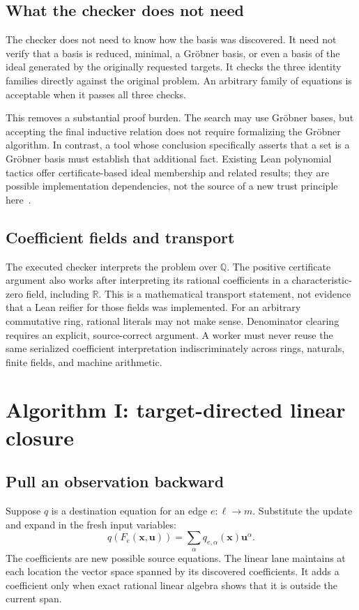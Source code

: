 \documentclass[11pt,letterpaper]{article}
\theoremstyle{definition}
\newcommand{\Q}{\mathbb Q}
\newcommand{\R}{\mathbb R}
\begin{document}
\subsection{What the checker does not need}
The checker does not need to know how the basis was discovered. It need not
verify that a basis is reduced, minimal, a Gr\"obner basis, or even a basis of
the ideal generated by the originally requested targets. It checks the three
identity families directly against the original problem. An arbitrary family
of equations is acceptable when it passes all three checks.

This removes a substantial proof burden. The search may use Gr\"obner bases,
but accepting the final inductive relation does not require formalizing the
Gr\"obner algorithm. In contrast, a tool whose conclusion specifically asserts
that a set is a Gr\"obner basis must establish that additional fact. Existing
Lean polynomial tactics offer certificate-based ideal membership and related
results; they are possible implementation dependencies, not the source of a new
trust principle here~\cite{groebner-tactics}.

\subsection{Coefficient fields and transport}
The executed checker interprets the problem over $\Q$. The positive certificate
argument also works after interpreting its rational coefficients in a
characteristic-zero field, including $\R$. This is a mathematical transport
statement, not evidence that a Lean reifier for those fields was implemented.
For an arbitrary commutative ring, rational literals may not make sense.
Denominator clearing requires an explicit, source-correct argument. A worker
must never reuse the same serialized coefficient interpretation indiscriminately
across rings, naturals, finite fields, and machine arithmetic.

\section{Algorithm I: target-directed linear closure}
\label{sec:linear}

\subsection{Pull an observation backward}
Suppose $q$ is a destination equation for an edge $e:\ell\to m$. Substitute
the update and expand in the fresh input variables:
\begin{equation}\label{eq:coeff}
 q(F_e(\bm x,\bm u))=\sum_{\alpha}q_{e,\alpha}(\bm x)\bm u^\alpha.
\end{equation}
The coefficients are new possible source equations. The linear lane maintains
at each location the vector space spanned by its discovered coefficients. It
adds a coefficient only when exact rational linear algebra shows that it is
outside the current span.
\end{document}
